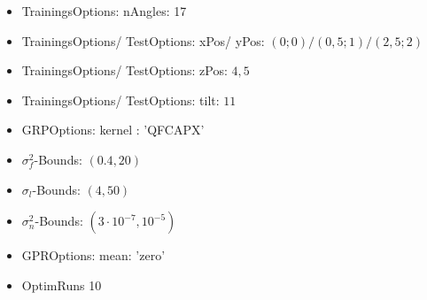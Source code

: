 \begin{itemize}
	\item TrainingsOptions: nAngles: 17
	\item TrainingsOptions/ TestOptions: xPos/ yPos: $(0;0)/(0,5;1)/(2,5;2)$
	\item TrainingsOptions/ TestOptions: zPos: $4,5$
	\item TrainingsOptions/ TestOptions: tilt: $11$
	\item GRPOptions: kernel : 'QFCAPX'
	\item $\sigma_f^2$-Bounds: $(0.4,20)$
	\item $\sigma_l$-Bounds: $(4,50)$
	\item $\sigma_n^2$-Bounds: $(3\cdot10^{-7},10^{-5})$
	\item GPROptions: mean: 'zero'
	\item OptimRuns 10
\end{itemize}

